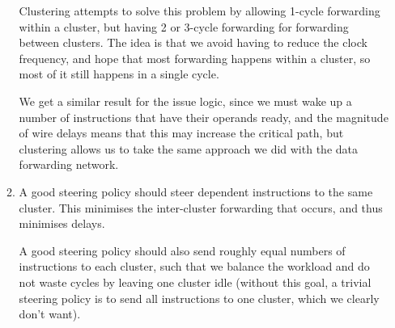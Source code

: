 \begin{enumerate}[label=(\alph*)]
\begin{enumerate}[label=(\roman*)]
        Clustering attempts to solve this problem by allowing 1-cycle forwarding within a cluster, but having 2 or 3-cycle forwarding for forwarding between clusters. The idea is that we avoid having to reduce the clock frequency, and hope that most forwarding happens within a cluster, so most of it still happens in a single cycle.

        We get a similar result for the issue logic, since we must wake up a number of instructions that have their operands ready, and the magnitude of wire delays means that this may increase the critical path, but clustering allows us to take the same approach we did with the data forwarding network.

      \item
        A good steering policy should steer dependent instructions to the same cluster. This minimises the inter-cluster forwarding that occurs, and thus minimises delays.

        A good steering policy should also send roughly equal numbers of instructions to each cluster, such that we balance the workload and do not waste cycles by leaving one cluster idle (without this goal, a trivial steering policy is to send all instructions to one cluster, which we clearly don't want).
        
    \end{enumerate}

        
\end{enumerate}

